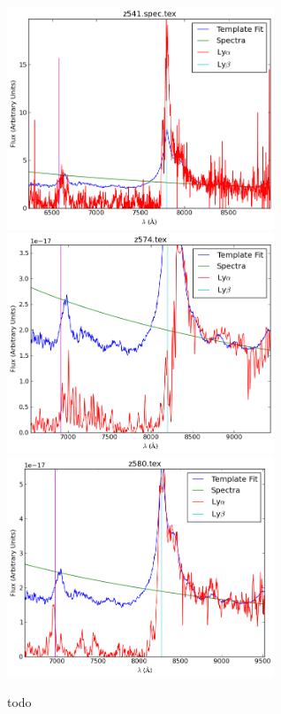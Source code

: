 \documentclass[11pt]{article}
\begin{document}
\begin{figure}[h]
  \includegraphics[width=8cm]{z541_spec.png}
  \includegraphics[width=8cm]{z574.png}
  \includegraphics[width=8cm]{z580.png}
  \caption{todo}
  \label{fig:todo}
\end{figure}
\end{document}
